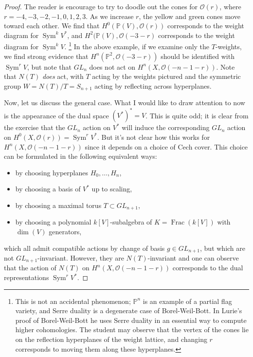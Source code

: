 \documentclass[10pt]{article}
\theoremstyle{definition}
\DeclareMathOperator{\Sym}{Sym}
\DeclareMathOperator{\Frac}{Frac}
\newcommand{\PP}{\mathbb{P}}
\newcommand{\OO}{\mathcal{O}}
\begin{document}
\begin{proof}
The reader is encourage to try to doodle out the cones for $\OO(r)$, where $r=-4,-3,-2,-1,0,1,2,3$.  As we increase $r$, the yellow and green cones move toward each other.  We find that $H^0(\PP(V), \OO(r))$ corresponds to the weight diagram for $\Sym^k V^*$, and $H^2(\PP(V), \OO(-3-r)$ corresponds to the weight diagram for $\Sym^k V$.  \footnote{This is not an accidental phenomenon; $\PP^n$ is an example of a partial flag variety, and Serre duality is a degenerate case of Borel-Weil-Bott.  In Lurie's proof of Borel-Weil-Bott he uses Serre duality in an essential way to compute higher cohomologies.  The student may observe that the vertex of the cones lie on the reflection hyperplanes of the weight lattice, and changing $r$ corresponds to moving them along these hyperplanes.}  In the above example, if we examine only the $T$-weights, we find strong evidence that $H^n(\PP^2, \OO(-3-r))$ should be identified with $\Sym^r V$, but note that $GL_n$ does not act on $H^n(X, \OO(-n-1-r))$.  Note that $N(T)$ \emph{does} act, with $T$ acting by the weights pictured and the symmetric group $W = N(T)/T = S_{n+1}$ acting by reflecting across hyperplanes.


Now, let us discuss the general case.  What I would like to draw attention to now is the appearance of the dual space $(V^*)^* = V$.  This is quite odd; it is clear from the exercise that the $GL_n$ action on $V^*$ will induce the corresponding $GL_n$ action on $H^0(X, \OO(r)) = \Sym^r V^*$.  But it's not clear how this works for $H^n(X, \OO(-n-1-r))$ since it depends on a choice of Cech cover.  This choice can be formulated in the following equivalent ways:
\begin{itemize}
\item by choosing hyperplanes $H_0, \ldots, H_n$,
\item by choosing a basis of $V^*$ up to scaling,
\item by choosing a maximal torus $T \subset GL_{n+1}$,
\item by choosing a polynomial $k[V]$-subalgebra of $K = \Frac(k[V])$ with $\dim(V)$ generators,
\end{itemize}
which all admit compatible actions by change of basis $g \in GL_{n+1}$, but which are not $GL_{n+1}$-invariant.  However, they are $N(T)$-invariant and one can observe that the action of $N(T)$ on $H^n(X, \OO(-n-1-r))$ corresponds to the dual representations $\Sym^r V^*$.



\end{proof}
\end{document}
